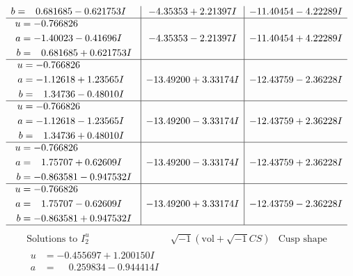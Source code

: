 \documentclass[1p]{elsarticle_modified}
\theoremstyle{definition}
\newcommand{\I}{\sqrt{-1}}
\begin{document}
$$\begin{array}{c|c|c}
\begin{aligned}
b &= \phantom{-}0.681685 - 0.621753 I\end{aligned}
 & -4.35353 + 2.21397 I & -11.40454 - 4.22289 I \\ \hline\begin{aligned}
u &= -0.766826\phantom{ +0.000000I} \\
a &= -1.40023 - 0.41696 I \\
b &= \phantom{-}0.681685 + 0.621753 I\end{aligned}
 & -4.35353 - 2.21397 I & -11.40454 + 4.22289 I \\ \hline\begin{aligned}
u &= -0.766826\phantom{ +0.000000I} \\
a &= -1.12618 + 1.23565 I \\
b &= \phantom{-}1.34736 - 0.48010 I\end{aligned}
 & -13.49200 + 3.33174 I & -12.43759 - 2.36228 I \\ \hline\begin{aligned}
u &= -0.766826\phantom{ +0.000000I} \\
a &= -1.12618 - 1.23565 I \\
b &= \phantom{-}1.34736 + 0.48010 I\end{aligned}
 & -13.49200 - 3.33174 I & -12.43759 + 2.36228 I \\ \hline\begin{aligned}
u &= -0.766826\phantom{ +0.000000I} \\
a &= \phantom{-}1.75707 + 0.62609 I \\
b &= -0.863581 - 0.947532 I\end{aligned}
 & -13.49200 - 3.33174 I & -12.43759 + 2.36228 I \\ \hline\begin{aligned}
u &= -0.766826\phantom{ +0.000000I} \\
a &= \phantom{-}1.75707 - 0.62609 I \\
b &= -0.863581 + 0.947532 I\end{aligned}
 & -13.49200 + 3.33174 I & -12.43759 - 2.36228 I\\
 \hline 
 \end{array}$$\newpage$$\begin{array}{c|c|c}  
\text{Solutions to }I^u_{2}& \I (\text{vol} + \sqrt{-1}CS) & \text{Cusp shape}\\
 \hline 
\begin{aligned}
u &= -0.455697 + 1.200150 I \\
a &= \phantom{-}0.259834 - 0.944414 I \\

\end{aligned}
\end{array}$$
\end{document}

